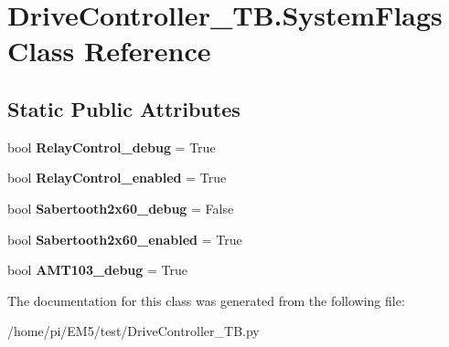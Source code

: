 \hypertarget{classDriveController__TB_1_1SystemFlags}{}\section{Drive\+Controller\+\_\+\+T\+B.\+System\+Flags Class Reference}
\label{classDriveController__TB_1_1SystemFlags}
\subsection*{Static Public Attributes}
\begin{DoxyCompactItemize}
\item 
\mbox{\label{classDriveController__TB_1_1SystemFlags_a75e0160652636e7d2828eef404f739df}} 
bool {\bfseries Relay\+Control\+\_\+debug} = True
\item 
\mbox{\label{classDriveController__TB_1_1SystemFlags_a7110154ba102e496ae73071dcc334514}} 
bool {\bfseries Relay\+Control\+\_\+enabled} = True
\item 
\mbox{\label{classDriveController__TB_1_1SystemFlags_a95cef368aea1141727c17f1eeddfdcd6}} 
bool {\bfseries Sabertooth2x60\+\_\+debug} = False
\item 
\mbox{\label{classDriveController__TB_1_1SystemFlags_a7d766a2578aa95143ab08a754183189b}} 
bool {\bfseries Sabertooth2x60\+\_\+enabled} = True
\item 
\mbox{\label{classDriveController__TB_1_1SystemFlags_a3d8666821c88c6b5c5601e139eada465}} 
bool {\bfseries A\+M\+T103\+\_\+debug} = True
\end{DoxyCompactItemize}


The documentation for this class was generated from the following file\+:\begin{DoxyCompactItemize}
\item 
/home/pi/\+E\+M5/test/Drive\+Controller\+\_\+\+T\+B.\+py\end{DoxyCompactItemize}
